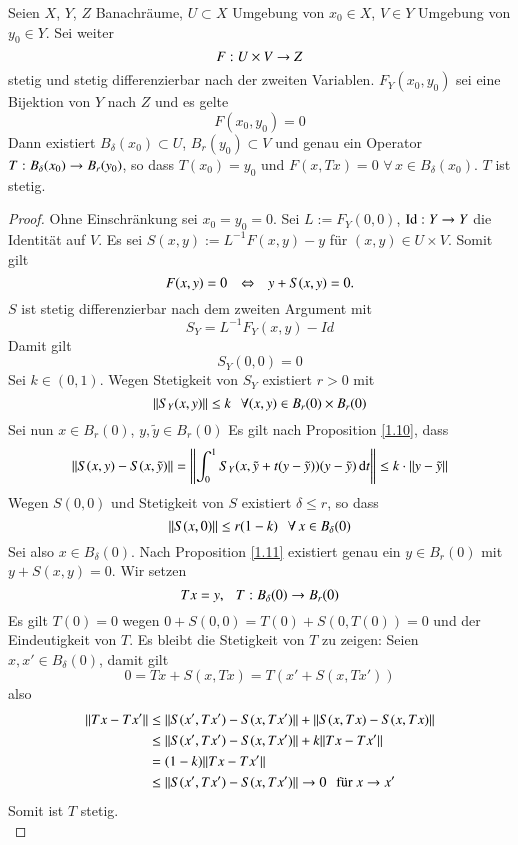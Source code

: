 \begin{theorem}\label{1.12}
    Seien $X$, $Y$, $Z$ Banachräume, $U\subset X$ Umgebung von $x_0\in X$, $V\in Y$ Umgebung von 
    $y_0 \in Y$. Sei weiter
    \[F:U\times V\rightarrow Z\]
    stetig und stetig differenzierbar nach der zweiten Variablen. $F_Y(x_0,y_0)$ sei eine Bijektion
    von $Y$ nach $Z$ und es gelte
    \[
        F(x_0,y_0)=0
    \]
    Dann existiert $B_\delta(x_0)\subset U$, $B_r(y_0)\subset V$ und genau ein Operator 
    $T:B_\delta(x_0)\rightarrow B_r(y_0)$, so dass $T(x_0)=y_0$ und $F(x,Tx)=0$ $\forall \, x\in B_\delta(x_0)$.
    $T$ ist stetig.
\end{theorem}

\begin{proof}
    Ohne Einschränkung sei $x_0=y_0=0$. Sei $L:= F_Y(0,0)$, $\mathrm{Id}: Y\rightarrow Y$ die Identität auf $V$. Es 
    sei $S(x,y):= L^{-1}F(x,y)-y$ für $(x,y)\in U\times V$. Somit gilt
    \[
        F(x,y)=0 \hspace{.25cm} \Leftrightarrow \hspace{.25cm} y+S(x,y)=0.
    \]
    $S$ ist stetig differenzierbar nach dem zweiten Argument mit
    \[
        S_Y=L^{-1} F_Y(x,y)-Id
    \]
    Damit gilt
    \[
        S_Y(0,0)=0
    \]
    Sei $k\in (0,1)$. Wegen Stetigkeit von $S_Y$ existiert $r>0$ mit 
    \[
        \|S_Y(x,y)\|\leq k \hspace{.25cm} \forall (x,y)\in B_r(0)\times B_r(0)
    \]
    Sei nun $x\in B_r(0)$, $y, \tilde y \in B_r(0)$
    Es gilt nach Proposition \ref{1.10}, dass
    \[
        \|S(x,y)-S(x,\tilde y)\|=\left\|\int_0^1 S_Y(x,\tilde y +t(y-\tilde y)) (y-\tilde y) \, \mathrm{d} t 
        \right\|\leq k\cdot\|y-\tilde y\|
    \]
    Wegen $S(0,0)$ und Stetigkeit von $S$ existiert $\delta \leq r$, so dass
    \[
        \|S(x,0)\|\leq r(1-k) \hspace{.25cm} \forall \, x \in B_\delta (0)
    \]
    Sei also $x\in B_\delta(0)$. Nach Proposition \ref{1.11} existiert genau ein $y\in B_r(0)$ mit
    $y+S(x,y)=0$. Wir setzen
    \[
        Tx=y, \hspace{.25cm} T:B_\delta(0)\rightarrow B_r(0)
    \]
    Es gilt $T(0)=0$ wegen $0+S(0,0)=T(0)+S(0,T(0))=0$ und der Eindeutigkeit von $T$. Es bleibt die
    Stetigkeit von $T$ zu zeigen: Seien $x,x'\in B_\delta (0)$, damit gilt
    \[
        0=Tx+S(x,Tx)=T(x'+S(x,Tx'))
    \]
    also
    \begin{align*}
        \|Tx-Tx'\|&\leq \|S(x',Tx')-S(x,Tx')\|+\|S(x,Tx)-S(x,Tx)\|\\
            &\leq \|S(x',Tx') - S(x,Tx')\|+k\|Tx-Tx'\|\\
            &= (1-k)\|Tx-Tx'\|\\
            &\leq \|S(x',Tx')-S(x,Tx')\| \rightarrow 0 \hspace{.25cm} \text{für $x\rightarrow x'$} 
    \end{align*}
    Somit ist $T$ stetig.
    \[\]
\end{proof}

